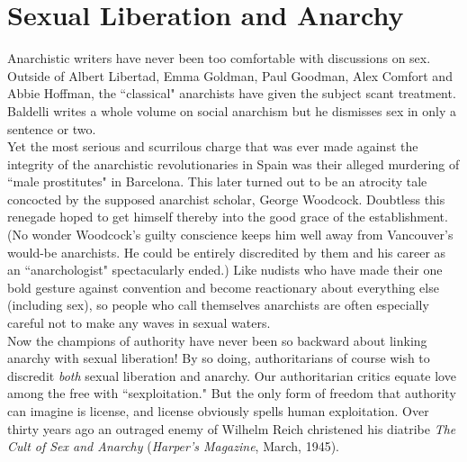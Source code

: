 \section*{Sexual Liberation and Anarchy}
Anarchistic writers have never been too comfortable with discussions on sex. Outside of Albert Libertad, Emma Goldman, Paul Goodman, Alex Comfort and Abbie Hoffman, the ``classical" anarchists have given the subject scant treatment. Baldelli writes a whole volume on social anarchism but he dismisses sex in only a sentence or two.\\
Yet the most serious and scurrilous charge that was ever made against the integrity of the anarchistic revolutionaries in Spain was their alleged murdering of ``male prostitutes" in Barcelona. This later turned out to be an atrocity tale concocted by the supposed anarchist scholar, George Woodcock. Doubtless this renegade hoped to get himself thereby into the good grace of the establishment. (No wonder Woodcock's guilty conscience keeps him well away from Vancouver's would-be anarchists. He could be entirely discredited by them and his career as an ``anarchologist" spectacularly ended.) Like nudists who have made their one bold gesture against convention and become reactionary about everything else (including sex), so people who call themselves anarchists are often especially careful not to make any waves in sexual 
 waters.\\
Now the champions of authority have never been so backward about linking anarchy with sexual liberation! By so doing, authoritarians of course wish to discredit \emph{both} sexual liberation and anarchy. Our authoritarian critics equate love among the free with ``sexploitation." But the only form of freedom that authority can imagine is license, and license obviously spells human exploitation. Over thirty years ago an outraged enemy of Wilhelm Reich christened his diatribe \emph{The Cult of Sex and Anarchy} (\emph{Harper's Magazine}, March, 1945).

